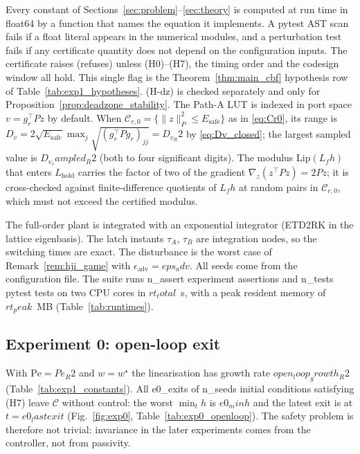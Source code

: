 Every constant of Sections~\ref{sec:problem}--\ref{sec:theory} is computed at run time in float64 by a function that
names the equation it implements. A pytest AST scan fails if a float literal appears in the numerical modules, and a
perturbation test fails if any certificate quantity does not depend on the configuration inputs. The certificate raises
(refuses) unless (H0)--(H7), the timing order and the codesign window all hold. This single flag is the
Theorem~\ref{thm:main_cbf} hypothesis row of Table~\ref{tab:exp1_hypotheses}. (H-dz) is checked separately and only
for Proposition~\ref{prop:deadzone_stability}. The Path-A LUT is indexed in port space \(v = g_r^\top P z\) by default.
When \(\mathcal C_{r,0} = \{\|z\|_P^2 \le E_{\mathrm{safe}}\}\) as in \eqref{eq:Cr0}, its range is
\(D_v = 2\sqrt{E_{\mathrm{safe}}}\max_j \sqrt{(g_r^\top P g_r)_{jj}} = {{D_v_R2}}\) by \eqref{eq:Dv_closed}; the largest
sampled value is \({{D_v_sampled_R2}}\) (both to four significant digits).
The modulus \(\mathrm{Lip}(L_fh)\) that enters \(L_{\mathrm{hold}}\) carries the factor of two of the gradient
\(\nabla_z(z^\top P z) = 2Pz\); it is cross-checked against finite-difference quotients of \(L_fh\) at random pairs in
\(\mathcal C_{r,0}\), which must not exceed the certified modulus.

The full-order plant is integrated with an exponential integrator (ETD2RK in the lattice eigenbasis). The latch
instants \(\tau_A\), \(\tau_B\) are integration nodes, so the switching times are exact. The disturbance is the worst
case of Remark~\ref{rem:hji_game} with \(\epsilon_{\mathrm{adv}} = {{eps_adv}}\). All seeds come from the configuration
file. The suite runs {{n_assert}} experiment assertions and {{n_tests}} pytest tests on two CPU cores in
\({{rt_total}}\)~s, with a peak resident memory of \({{rt_peak}}\)~MB (Table~\ref{tab:runtimes}).





\subsection{Experiment 0: open-loop exit}
With \(\mathrm{Pe} = {{Pe_R2}}\) and \(w = w^\star\) the linearisation has growth rate \({{open_loop_growth_R2}}\)
(Table~\ref{tab:exp1_constants}). All {{e0_exits}} of
{{n_seeds}} initial conditions satisfying (H7) leave \(\mathcal C\) without control: the worst \(\min_t h\) is
\({{e0_minh}}\) and the latest exit is at \(t = {{e0_lastexit}}\) (Fig.~\ref{fig:exp0}, Table~\ref{tab:exp0_openloop}).
The safety problem is therefore not trivial: invariance in the later experiments comes from the controller, not from
passivity.

